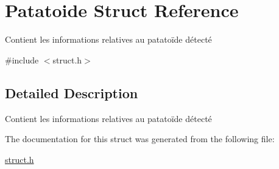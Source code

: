 \hypertarget{struct_patatoide}{}\section{Patatoide Struct Reference}
\label{struct_patatoide}


Contient les informations relatives au patatoïde détecté  




{\ttfamily \#include $<$struct.\+h$>$}



\subsection{Detailed Description}
Contient les informations relatives au patatoïde détecté 

The documentation for this struct was generated from the following file\+:\begin{DoxyCompactItemize}
\item 
\hyperlink{struct_8h}{struct.\+h}\end{DoxyCompactItemize}
